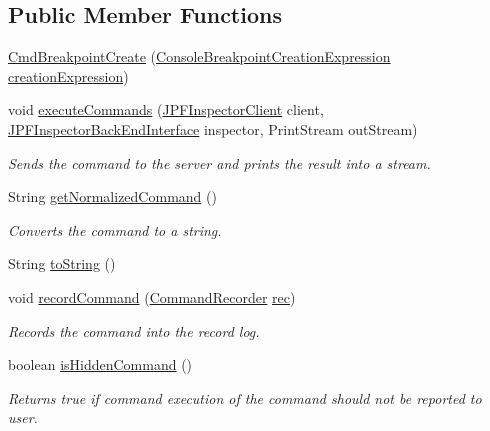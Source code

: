 \subsection*{Public Member Functions}
\begin{DoxyCompactItemize}
\item 
\hyperlink{classgov_1_1nasa_1_1jpf_1_1inspector_1_1client_1_1commands_1_1_cmd_breakpoint_create_afd1e47a17c1946f095b7b6a9c32e397e}{Cmd\+Breakpoint\+Create} (\hyperlink{classgov_1_1nasa_1_1jpf_1_1inspector_1_1client_1_1commands_1_1_cmd_breakpoint_create_1_1_console_breakpoint_creation_expression}{Console\+Breakpoint\+Creation\+Expression} \hyperlink{classgov_1_1nasa_1_1jpf_1_1inspector_1_1client_1_1commands_1_1_cmd_breakpoint_create_a5b4a48a9d6bb14f38d3abdccd3b0acb1}{creation\+Expression})
\item 
void \hyperlink{classgov_1_1nasa_1_1jpf_1_1inspector_1_1client_1_1commands_1_1_cmd_breakpoint_create_aae8fdbc6a55d78e9bb1c0f46c65d658a}{execute\+Commands} (\hyperlink{classgov_1_1nasa_1_1jpf_1_1inspector_1_1client_1_1_j_p_f_inspector_client}{J\+P\+F\+Inspector\+Client} client, \hyperlink{interfacegov_1_1nasa_1_1jpf_1_1inspector_1_1interfaces_1_1_j_p_f_inspector_back_end_interface}{J\+P\+F\+Inspector\+Back\+End\+Interface} inspector, Print\+Stream out\+Stream)
\begin{DoxyCompactList}\small\item\em Sends the command to the server and prints the result into a stream. \end{DoxyCompactList}\item 
String \hyperlink{classgov_1_1nasa_1_1jpf_1_1inspector_1_1client_1_1commands_1_1_cmd_breakpoint_create_a143cdf8f288deadb20eccccc254b41e6}{get\+Normalized\+Command} ()
\begin{DoxyCompactList}\small\item\em Converts the command to a string. \end{DoxyCompactList}\item 
String \hyperlink{classgov_1_1nasa_1_1jpf_1_1inspector_1_1client_1_1commands_1_1_cmd_breakpoint_create_af9150392488644b4a8cf9049db46f81f}{to\+String} ()
\item 
void \hyperlink{classgov_1_1nasa_1_1jpf_1_1inspector_1_1client_1_1_client_command_ae0670332ec750bc5b9016d0b04d8adfe}{record\+Command} (\hyperlink{classgov_1_1nasa_1_1jpf_1_1inspector_1_1client_1_1_command_recorder}{Command\+Recorder} \hyperlink{classgov_1_1nasa_1_1jpf_1_1inspector_1_1client_1_1_client_command_af4246f2427035c72a6af45a2c61361f7}{rec})
\begin{DoxyCompactList}\small\item\em Records the command into the record log. \end{DoxyCompactList}\item 
boolean \hyperlink{classgov_1_1nasa_1_1jpf_1_1inspector_1_1client_1_1_client_command_afb09c400c64e2d8e01059b91ff847761}{is\+Hidden\+Command} ()
\begin{DoxyCompactList}\small\item\em Returns true if command execution of the command should not be reported to user. \end{DoxyCompactList}\end{DoxyCompactItemize}
